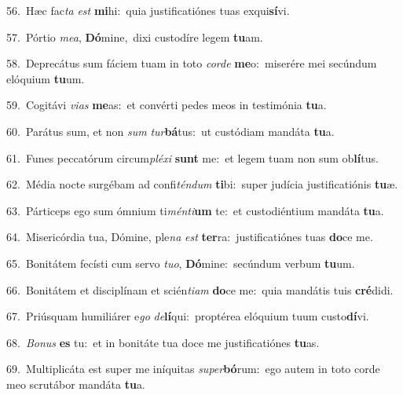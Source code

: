 {\numbfont\textcolor{\numbcolor}{56.}}~Hæc fac\textit{ta} \textit{est} \textbf{mi}\-hi:~\star quia justificatiónes tuas exqui\-\textbf{sí}\-vi.\par
{\numbfont\textcolor{\numbcolor}{57.}}~Pórtio \textit{me}\-\textit{a}, \textbf{Dó}\-mine,~\star dixi custodíre legem \textbf{tu}\-am.\par
{\numbfont\textcolor{\numbcolor}{58.}}~Deprecátus sum fáciem tuam in toto \textit{cor}\-\textit{de} \textbf{me}\-o:~\star miserére mei secúndum elóquium \textbf{tu}\-um.\par
{\numbfont\textcolor{\numbcolor}{59.}}~Cogitávi \textit{vi}\-\textit{as} \textbf{me}\-as:~\star et convérti pedes meos in testimónia \textbf{tu}\-a.\par
{\numbfont\textcolor{\numbcolor}{60.}}~Parátus sum, et non \textit{sum} \textit{tur}\-\textbf{bá}tus:~\star ut custódiam mandáta \textbf{tu}\-a.\par
{\numbfont\textcolor{\numbcolor}{61.}}~Funes peccatórum circum\-\textit{plé}\-\textit{xi} \textbf{sunt} me:~\star et legem tuam non sum ob\-\textbf{lí}\-tus.\par
{\numbfont\textcolor{\numbcolor}{62.}}~Média nocte surgébam ad confi\-\textit{tén}\-\textit{dum} \textbf{ti}\-bi:~\star super judícia justificatiónis \textbf{tu}\-æ.\par
{\numbfont\textcolor{\numbcolor}{63.}}~Párticeps ego sum ómnium ti\-\textit{mén}\-\textit{ti}\textbf{um} te:~\star et custodiéntium mandáta \textbf{tu}\-a.\par
{\numbfont\textcolor{\numbcolor}{64.}}~Misericórdia tua, Dómine, ple\textit{na} \textit{est} \textbf{ter}\-ra:~\star justificatiónes tuas \textbf{do}\-ce me.\par
{\numbfont\textcolor{\numbcolor}{65.}}~Bonitátem fecísti cum servo \textit{tu}\-\textit{o}, \textbf{Dó}\-mine:~\star secúndum verbum \textbf{tu}\-um.\par
{\numbfont\textcolor{\numbcolor}{66.}}~Bonitátem et disciplínam et scién\-\textit{ti}\-\textit{am} \textbf{do}\-ce me:~\star quia mandátis tuis \textbf{cré}\-didi.\par
{\numbfont\textcolor{\numbcolor}{67.}}~Priúsquam humiliárer e\textit{go} \textit{de}\-\textbf{lí}qui:~\star proptérea elóquium tuum custo\-\textbf{dí}\-vi.\par
{\numbfont\textcolor{\numbcolor}{68.}}~\-\textit{Bo}\-\textit{nus} \textbf{es} tu:~\star et in bonitáte tua doce me justificatiónes \textbf{tu}\-as.\par
{\numbfont\textcolor{\numbcolor}{69.}}~Multiplicáta est super me iníquitas \textit{su}\-\textit{per}\textbf{bó}rum:~\star ego autem in toto corde meo scrutábor mandáta \textbf{tu}\-a.\par
